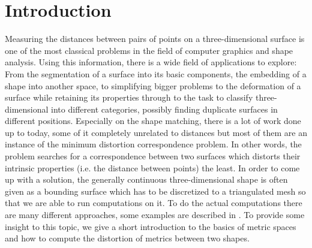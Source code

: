 \chapter{Introduction}
\label{chapter:introduction}

Measuring the distances between pairs of points on a three-dimensional surface is one of the most classical problems in the field of computer graphics and shape analysis.
Using this information, there is a wide field of applications to explore:
From the segmentation of a surface into its basic components, the embedding of a shape into another space, to simplifying bigger problems to the deformation of a surface while retaining its properties  through to the task to classify three-dimensional into different categories, possibly finding duplicate surfaces in different positions.
Especially on the shape matching, there is a lot of work done up to today, some of it completely unrelated to distances but most of them are an instance of the minimum distortion correspondence problem.
In other words, the problem searches for a correspondence between two surfaces which distorts their intrinsic properties (i.e. the distance between points) the least.
In order to come up with a solution, the generally continuous three-dimensional shape is often given as a bounding surface which has to be discretized to a triangulated mesh so that we are able to run computations on it.
To do the actual computations there are many different approaches, some examples are described in \cite{rodola2012game,bronstein2006generalized,memoli2009spectral}.
To provide some insight to this topic, we give a short introduction to the basics of metric spaces and how to compute the distortion of metrics between two shapes.

